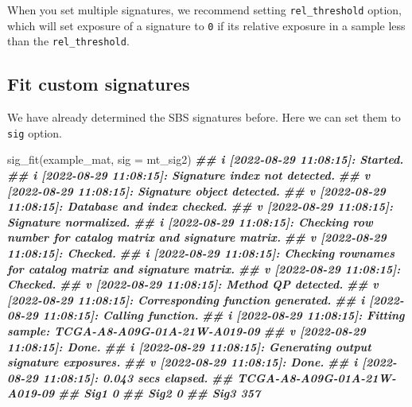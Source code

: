 \documentclass[
  12pt,
  a4paper,
  twoside]{book}
\newenvironment{Shaded}{\begin{snugshade}}{\end{snugshade}}
\newcommand{\AttributeTok}[1]{\textcolor[rgb]{0.77,0.63,0.00}{#1}}
\newcommand{\DocumentationTok}[1]{\textcolor[rgb]{0.56,0.35,0.01}{\textbf{\textit{#1}}}}
\newcommand{\FunctionTok}[1]{\textcolor[rgb]{0.00,0.00,0.00}{#1}}
\newcommand{\NormalTok}[1]{#1}
\begin{document}
When you set multiple signatures, we recommend setting \texttt{rel\_threshold} option, which will set exposure of a signature to \texttt{0} if its relative exposure in a sample less than the \texttt{rel\_threshold}.

\hypertarget{fit-custom-signatures}{%
\subsection{Fit custom signatures}\label{fit-custom-signatures}}

We have already determined the SBS signatures before. Here we can set them to \texttt{sig} option.

\begin{Shaded}
\begin{Highlighting}[]
\FunctionTok{sig\_fit}\NormalTok{(example\_mat, }\AttributeTok{sig =}\NormalTok{ mt\_sig2)}
\DocumentationTok{\#\# i [2022{-}08{-}29 11:08:15]: Started.}
\DocumentationTok{\#\# i [2022{-}08{-}29 11:08:15]: Signature index not detected.}
\DocumentationTok{\#\# v [2022{-}08{-}29 11:08:15]: Signature object detected.}
\DocumentationTok{\#\# v [2022{-}08{-}29 11:08:15]: Database and index checked.}
\DocumentationTok{\#\# v [2022{-}08{-}29 11:08:15]: Signature normalized.}
\DocumentationTok{\#\# i [2022{-}08{-}29 11:08:15]: Checking row number for catalog matrix and signature matrix.}
\DocumentationTok{\#\# v [2022{-}08{-}29 11:08:15]: Checked.}
\DocumentationTok{\#\# i [2022{-}08{-}29 11:08:15]: Checking rownames for catalog matrix and signature matrix.}
\DocumentationTok{\#\# v [2022{-}08{-}29 11:08:15]: Checked.}
\DocumentationTok{\#\# v [2022{-}08{-}29 11:08:15]: Method \textquotesingle{}QP\textquotesingle{} detected.}
\DocumentationTok{\#\# v [2022{-}08{-}29 11:08:15]: Corresponding function generated.}
\DocumentationTok{\#\# i [2022{-}08{-}29 11:08:15]: Calling function.}
\DocumentationTok{\#\# i [2022{-}08{-}29 11:08:15]: Fitting sample: TCGA{-}A8{-}A09G{-}01A{-}21W{-}A019{-}09}
\DocumentationTok{\#\# v [2022{-}08{-}29 11:08:15]: Done.}
\DocumentationTok{\#\# i [2022{-}08{-}29 11:08:15]: Generating output signature exposures.}
\DocumentationTok{\#\# v [2022{-}08{-}29 11:08:15]: Done.}
\DocumentationTok{\#\# i [2022{-}08{-}29 11:08:15]: 0.043 secs elapsed.}
\DocumentationTok{\#\#      TCGA{-}A8{-}A09G{-}01A{-}21W{-}A019{-}09}
\DocumentationTok{\#\# Sig1                            0}
\DocumentationTok{\#\# Sig2                            0}
\DocumentationTok{\#\# Sig3                          357}
\end{Highlighting}
\end{Shaded}
\end{document}
